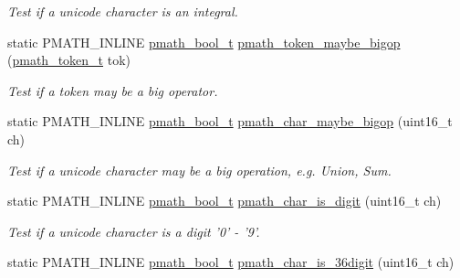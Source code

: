 \begin{CompactItemize}
\begin{CompactList}\small\item\em Test if a unicode character is an integral. \item\end{CompactList}\item 
\hypertarget{group__parser_g28b52f6d7919338f54072961e86bb686}{
static PMATH\_\-INLINE \hyperlink{group__general__types_gc92090cb0b56345d6c379ed2341d4ef4}{pmath\_\-bool\_\-t} \hyperlink{group__parser_g28b52f6d7919338f54072961e86bb686}{pmath\_\-token\_\-maybe\_\-bigop} (\hyperlink{group__parser_gfae0ba850f83a3a4560de57bee81e4b5}{pmath\_\-token\_\-t} tok)}
\label{group__parser_g28b52f6d7919338f54072961e86bb686}

\begin{CompactList}\small\item\em Test if a token may be a big operator. \item\end{CompactList}\item 
\hypertarget{group__parser_g557ac78b13961a3e72b0fcebb46a3c5a}{
static PMATH\_\-INLINE \hyperlink{group__general__types_gc92090cb0b56345d6c379ed2341d4ef4}{pmath\_\-bool\_\-t} \hyperlink{group__parser_g557ac78b13961a3e72b0fcebb46a3c5a}{pmath\_\-char\_\-maybe\_\-bigop} (uint16\_\-t ch)}
\label{group__parser_g557ac78b13961a3e72b0fcebb46a3c5a}

\begin{CompactList}\small\item\em Test if a unicode character may be a big operation, e.g. Union, Sum. \item\end{CompactList}\item 
\hypertarget{group__parser_g3a8ea2f181cfe0789629991ed5433bc3}{
static PMATH\_\-INLINE \hyperlink{group__general__types_gc92090cb0b56345d6c379ed2341d4ef4}{pmath\_\-bool\_\-t} \hyperlink{group__parser_g3a8ea2f181cfe0789629991ed5433bc3}{pmath\_\-char\_\-is\_\-digit} (uint16\_\-t ch)}
\label{group__parser_g3a8ea2f181cfe0789629991ed5433bc3}

\begin{CompactList}\small\item\em Test if a unicode character is a digit '0' - '9'. \item\end{CompactList}\item 
\hypertarget{group__parser_g0880b1ff12deb03d8bdd8cf87ec03dad}{
static PMATH\_\-INLINE \hyperlink{group__general__types_gc92090cb0b56345d6c379ed2341d4ef4}{pmath\_\-bool\_\-t} \hyperlink{group__parser_g0880b1ff12deb03d8bdd8cf87ec03dad}{pmath\_\-char\_\-is\_\-36digit} (uint16\_\-t ch)}
\label{group__parser_g0880b1ff12deb03d8bdd8cf87ec03dad}


\end{CompactItemize}
